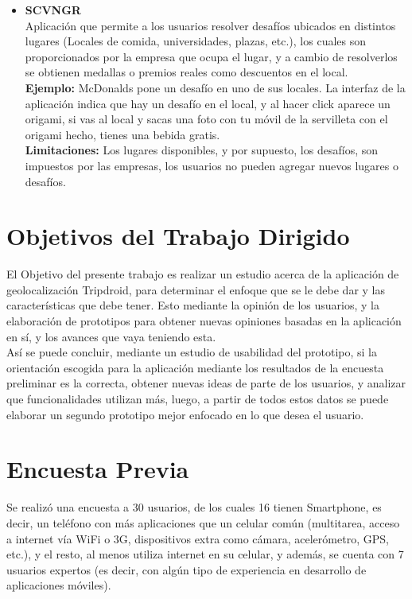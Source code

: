 \documentclass[10pt,letterpaper]{article}
\begin{document}
\begin{itemize}
\item \textbf{SCVNGR}\\

Aplicación que permite a los usuarios resolver desafíos ubicados en distintos lugares (Locales de comida, universidades, plazas, etc.), los cuales son proporcionados por la empresa que ocupa el lugar, y a cambio de resolverlos se obtienen medallas o premios reales como descuentos en el local.\\
\textbf{Ejemplo:} McDonalds pone un desafío en uno de sus locales. La interfaz de la aplicación indica que hay un desafío en el local, y al hacer click aparece un origami, si vas al local y sacas una foto con tu móvil de la servilleta con el origami hecho, tienes una bebida gratis.\\
\textbf{Limitaciones:} Los lugares disponibles, y por supuesto, los desafíos, son impuestos por las empresas, los usuarios no pueden agregar nuevos lugares o desafíos.
\end{itemize}

\newpage
\section{Objetivos del Trabajo Dirigido}

El Objetivo del presente trabajo es realizar un estudio acerca de la aplicación de geolocalización Tripdroid, para determinar el enfoque que se le debe dar y las características que debe tener. Esto mediante la opinión de los usuarios, y la elaboración de prototipos para obtener nuevas opiniones basadas en la aplicación en sí, y los avances que vaya teniendo esta.\\

Así se puede concluir, mediante un estudio de usabilidad del prototipo, si la orientación escogida para la aplicación mediante los resultados de la encuesta preliminar es la correcta, obtener nuevas ideas de parte de los usuarios, y analizar que funcionalidades utilizan más, luego, a partir de todos estos datos se puede elaborar un segundo prototipo mejor enfocado en lo que desea el usuario.\\

\newpage
\section{Encuesta Previa}

Se realizó una encuesta a 30 usuarios, de los cuales 16 tienen Smartphone, es decir, un teléfono con más aplicaciones que un celular común (multitarea, acceso a internet vía WiFi o 3G, dispositivos extra como cámara, acelerómetro, GPS, etc.), y el resto, al menos utiliza internet en su celular, y además, se cuenta con 7 usuarios expertos (es decir, con algún tipo de experiencia en desarrollo de aplicaciones móviles).\\
\end{document}
